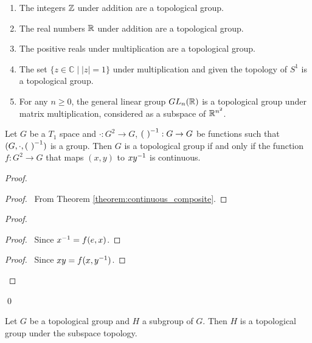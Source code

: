\begin{example}
    \begin{enumerate}
        \item The integers $\mathbb{Z}$ under addition are a topological group.
        \item The real numbers $\mathbb{R}$ under addition are a topological group.
        \item The positive reals under multiplication are a topological group.
        \item The set $\{ z \in \mathbb{C} \mid |z| = 1 \}$ under multiplication
        and given the topology of $S^1$ is a topological group.
        \item For any $n \geq 0$, the general linear group $GL_n(\mathbb{R})$ is a topological
        group under matrix multiplication, considered as a subspace of $\mathbb{R}^{n^2}$.
    \end{enumerate}
\end{example}

\begin{lemma}
    Let $G$ be a $T_1$ space and $\cdot : G^2 \rightarrow G$, ${(\ )}^{-1} : G \rightarrow G$
    be functions such that $(G, \cdot, \inv{(\ )})$ is a group. Then $G$ is a
    topological group if and only if the function $f : G^2 \rightarrow G$ that maps
    $(x,y)$ to $x {y}^{-1}$ is continuous.
\end{lemma}

\begin{proof}
    \pf
    \begin{proof}
        \pf\ From Theorem \ref{theorem:continuous_composite}.
    \end{proof}
    \begin{proof}
        \begin{proof}
            \pf\ Since ${x}^{-1} = f(e,x)$.
        \end{proof}
        \begin{proof}
            \pf\ Since $xy = f(x,{y}^{-1})$.
        \end{proof}
    \end{proof}
    \qed
\end{proof}

\begin{lemma}
    Let $G$ be a topological group and $H$ a subgroup of $G$. Then $H$ is a topological group
    under the subspace topology.
\end{lemma}

